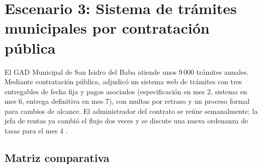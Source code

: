 \documentclass[11pt,a4paper]{article}
\begin{document}
\section{Escenario 3: Sistema de trámites municipales por contratación pública}

El GAD Municipal de San Isidro del Baba atiende unos 9\,000 trámites anuales. Mediante contratación pública, adjudicó un sistema web de trámites con tres entregables de fecha fija y pagos asociados (especificación en mes 2, sistema en mes 6, entrega definitiva en mes 7), con multas por retraso y un proceso formal para cambios de alcance. El administrador del contrato se reúne semanalmente; la jefa de rentas ya cambió el flujo dos veces y se discute una nueva ordenanza de tasas para el mes 4 \cite[sec.~5.3]{materialGA}.

\subsection{Matriz comparativa}
\end{document}
